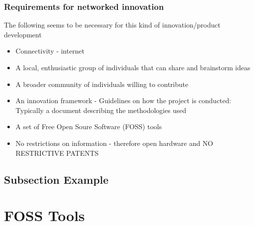 \documentclass{beamer}
\begin{document}
\begin{frame}
\frametitle{Requirements for networked innovation}

The following seems to be necessary for this kind of innovation/product development

\begin{itemize}
\item Connectivity - internet
\item A local, enthusiastic group of individuals that can share and brainstorm ideas %
\item A broader community of individuals willing to contribute
\item An innovation framework - Guidelines on how the project is conducted:  Typically a document describing the methodologies used
\item A set of Free Open Soure Software (FOSS) tools
\item No restrictions on information - therefore open hardware and NO RESTRICTIVE PATENTS
\end{itemize}
\end{frame}



\subsection{Subsection Example} %



\section{FOSS Tools}

\end{document}
